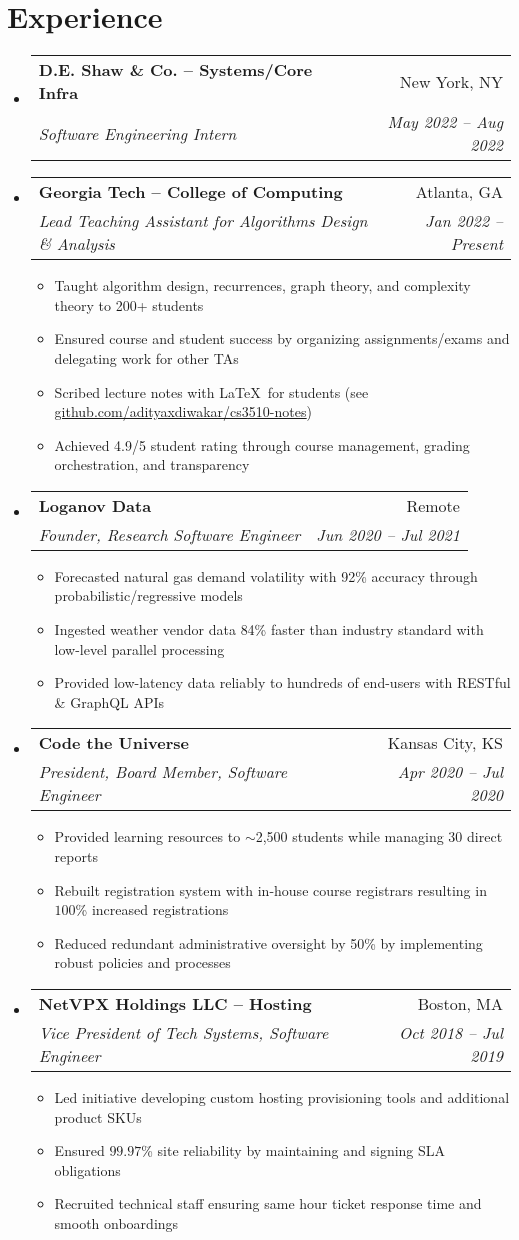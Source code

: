 \documentclass[a4paper,11pt]{extarticle}
\makeatletter
\newcommand{\resumeItem}[1]{
	\item\small{
		#1 \vspace{-2pt}
	}
}
\newcommand{\resumeSubheading}[4]{
	\vspace{-1pt}\item
		\begin{tabular*}{1\linewidth}{l@{\extracolsep{\fill}}r}
			\textbf{#1} & #2 \\
			\textit{#3} & \textit{#4} \\
		\end{tabular*}\vspace{-3pt}
}
\newcommand{\resumeSubHeadingListStart}{
    \begin{itemize}[leftmargin=0.15in,label={}]}
\newcommand{\resumeSubHeadingListEnd}{\end{itemize}}
\newcommand{\resumeItemListStart}{\begin{itemize}\vspace{-3pt}}
\newcommand{\resumeItemListEnd}{\end{itemize}\vspace{-3pt}}
\makeatother
\begin{document}
\section{Experience}
	\resumeSubHeadingListStart
        \resumeSubheading
            {D.E. Shaw \& Co. -- Systems/Core Infra}
            {New York, NY}
            {Software Engineering Intern}
            {May 2022 -- Aug 2022}
        \vspace{-1mm}
        \resumeSubheading
            {Georgia Tech -- College of Computing}
            {Atlanta, GA}
            {Lead Teaching Assistant for Algorithms Design \& Analysis}
            {Jan 2022 -- Present}
		\resumeItemListStart
			\resumeItem{Taught algorithm design, recurrences, graph
            theory, and complexity theory to 200+ students}
            \resumeItem{Ensured course and student success by organizing 
                assignments/exams and delegating work for other TAs}
            \resumeItem{Scribed lecture notes with \LaTeX\ 
                for students (see
                    \href{https://github.com/adityaxdiwakar/cs3510-notes}
                         {\underline{github.com/adityaxdiwakar/cs3510-notes}})}
            \resumeItem{Achieved 4.9/5 student rating through course management,
                grading orchestration, and transparency}
		\resumeItemListEnd
		\resumeSubheading
            {Loganov Data}
            {Remote}
		    {Founder, Research Software Engineer}
            {Jun 2020 -- Jul 2021}
		\resumeItemListStart
			\resumeItem{Forecasted natural gas demand volatility with 92\%
				accuracy through probabilistic/regressive models}
			\resumeItem{Ingested weather vendor data 84\% faster than industry
				standard with low-level parallel processing}
			\resumeItem{Provided low-latency data reliably to hundreds of
				end-users with RESTful \& GraphQL APIs}
		\resumeItemListEnd
		\resumeSubheading
            {Code the Universe}
            {Kansas City, KS}
		    {President, Board Member, Software Engineer}
            {Apr 2020 -- Jul 2020}
		\resumeItemListStart
			\resumeItem{Provided learning resources to $\sim$2,500
				students while managing 30 direct reports}
			\resumeItem{Rebuilt registration system with in-house course
				registrars resulting in $100$\% increased registrations}
			\resumeItem{Reduced redundant administrative oversight by 50\% by
				implementing robust policies and processes}
		\resumeItemListEnd
		\resumeSubheading
            {NetVPX Holdings LLC -- Hosting}
            {Boston, MA}
		    {Vice President of Tech Systems, Software Engineer}
            {Oct 2018 -- Jul 2019}
		\resumeItemListStart
			\resumeItem{Led initiative developing custom hosting provisioning
				tools and additional product SKUs}
			\resumeItem{Ensured $99.97$\% site reliability by maintaining
				and signing SLA obligations}
			\resumeItem{Recruited technical staff ensuring same hour ticket
				response time and smooth onboardings}
		\resumeItemListEnd
	\resumeSubHeadingListEnd
\end{document}
